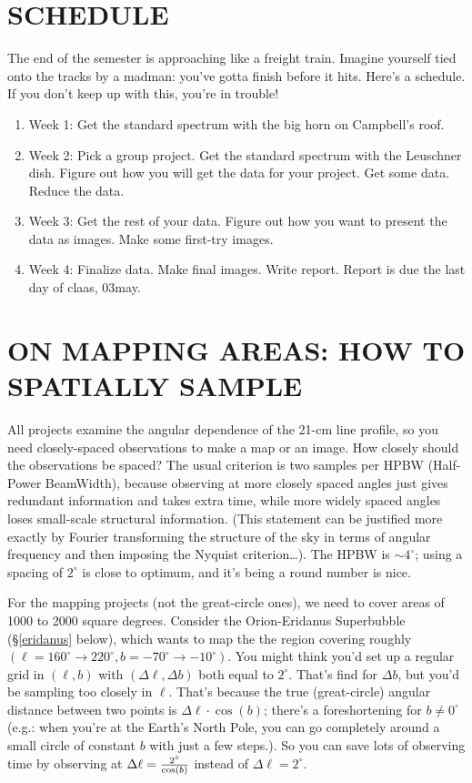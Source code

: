 \documentclass[preprint]{aastex}
\begin{document}
\section{SCHEDULE}

The end of the semester is approaching like a freight train. Imagine
yourself tied onto the tracks by a madman: you've gotta finish before it
hits. Here's a schedule. If you don't keep up with this, you're in
trouble! \begin{enumerate}

\item Week 1: Get the standard spectrum with the big horn
  on Campbell's roof.

\item Week 2: Pick a group project. Get the standard
  spectrum with the Leuschner dish. Figure out how you will get the data
  for your project. Get some data. Reduce the data.

\item Week 3: Get the rest of your data. Figure out
  how you want to present the data as images. Make some first-try
  images. 

\item Week 4: Finalize data. Make final images. Write
report. Report is due the last day of claas, 03may.
\end{enumerate}


\section{ON MAPPING AREAS: HOW TO SPATIALLY SAMPLE} \label{sampling} 

All projects examine the angular dependence of the 21-cm line profile,
so you need closely-spaced observations to make a map or an image. How
closely should the observations be spaced?  The usual criterion is two
samples per HPBW (Half-Power BeamWidth), because observing at more
closely spaced angles just gives redundant information and takes extra
time, while more widely spaced angles loses small-scale structural
information. (This statement can be justified more exactly by Fourier
transforming the structure of the sky in terms of angular frequency and
then imposing the Nyquist criterion\dots).  The HPBW is $\sim 4^\circ$;
using a spacing of $2^\circ$ is close to optimum, and it's being a round
number is nice.

For the mapping projects (not the great-circle ones), we need to cover
areas of 1000 to 2000 square degrees. Consider the Orion-Eridanus
Superbubble (\S \ref{eridanus} below), which wants to map the the region
covering roughly $(\ell=160^\circ \rightarrow 220^\circ, b=-70^\circ
\rightarrow -10^\circ)$. You might think you'd set up a regular grid in
$(\ell,b)$ with $(\Delta \ell, \Delta b)$ both equal to
$2^\circ$. That's find for $\Delta b$, but you'd be sampling too closely
in $\ell$. That's because the true (great-circle) angular distance
between two points is $\Delta \ell \cdot \cos(b)$; there's a
foreshortening for $b \ne 0^\circ$ (e.g.: when you're at the Earth's
North Pole, you can go completely around a small circle of constant $b$
with just a few steps.). So you can save lots of observing time by
observing at $\Delta \ell = {2^\circ \over \cos(b)}$ instead of $\Delta
\ell = 2^\circ$.
\end{document}
